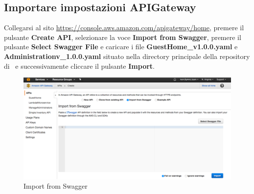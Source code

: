 \documentclass[../ManualeSviluppatore_v2.0.0.tex]{subfiles}
\begin{document}
	\subsection{Importare impostazioni APIGateway}
		Collegarsi al sito \url{https://console.aws.amazon.com/apigateway/home}, premere il pulsante \textbf{Create API}, selezionare la voce \textbf{Import from Swagger}, premere il pulsante \textbf{Select Swagger File} e caricare i file \textbf{GuestHome\_v1.0.0.yaml} e \textbf{Administrationv\_1.0.0.yaml} situato nella directory principale della repository di \atavi\ e successivamente cliccare il pulsante \textbf{Import}.
		\begin{figure}[!h]
			\centering
			\includegraphics[width=\textwidth]{Screenshot/ImportSwagger.png}
			\caption{Import from Swagger}
		\end{figure}
\end{document}
